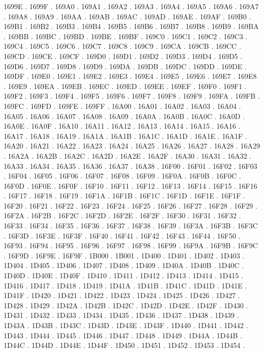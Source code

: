 1699E .
1699F .
169A0 .
169A1 .
169A2 .
169A3 .
169A4 .
169A5 .
169A6 .
169A7 .
169A8 .
169A9 .
169AA .
169AB .
169AC .
169AD .
169AE .
169AF .
169B0 .
169B1 .
169B2 .
169B3 .
169B4 .
169B5 .
169B6 .
169B7 .
169B8 .
169B9 .
169BA .
169BB .
169BC .
169BD .
169BE .
169BF .
169C0 .
169C1 .
169C2 .
169C3 .
169C4 .
169C5 .
169C6 .
169C7 .
169C8 .
169C9 .
169CA .
169CB .
169CC .
169CD .
169CE .
169CF .
169D0 .
169D1 .
169D2 .
169D3 .
169D4 .
169D5 .
169D6 .
169D7 .
169D8 .
169D9 .
169DA .
169DB .
169DC .
169DD .
169DE .
169DF .
169E0 .
169E1 .
169E2 .
169E3 .
169E4 .
169E5 .
169E6 .
169E7 .
169E8 .
169E9 .
169EA .
169EB .
169EC .
169ED .
169EE .
169EF .
169F0 .
169F1 .
169F2 .
169F3 .
169F4 .
169F5 .
169F6 .
169F7 .
169F8 .
169F9 .
169FA .
169FB .
169FC .
169FD .
169FE .
169FF .
16A00 .
16A01 .
16A02 .
16A03 .
16A04 .
16A05 .
16A06 .
16A07 .
16A08 .
16A09 .
16A0A .
16A0B .
16A0C .
16A0D .
16A0E .
16A0F .
16A10 .
16A11 .
16A12 .
16A13 .
16A14 .
16A15 .
16A16 .
16A17 .
16A18 .
16A19 .
16A1A .
16A1B .
16A1C .
16A1D .
16A1E .
16A1F .
16A20 .
16A21 .
16A22 .
16A23 .
16A24 .
16A25 .
16A26 .
16A27 .
16A28 .
16A29 .
16A2A .
16A2B .
16A2C .
16A2D .
16A2E .
16A2F .
16A30 .
16A31 .
16A32 .
16A33 .
16A34 .
16A35 .
16A36 .
16A37 .
16A38 .
16F00 .
16F01 .
16F02 .
16F03 .
16F04 .
16F05 .
16F06 .
16F07 .
16F08 .
16F09 .
16F0A .
16F0B .
16F0C .
16F0D .
16F0E .
16F0F .
16F10 .
16F11 .
16F12 .
16F13 .
16F14 .
16F15 .
16F16 .
16F17 .
16F18 .
16F19 .
16F1A .
16F1B .
16F1C .
16F1D .
16F1E .
16F1F .
16F20 .
16F21 .
16F22 .
16F23 .
16F24 .
16F25 .
16F26 .
16F27 .
16F28 .
16F29 .
16F2A .
16F2B .
16F2C .
16F2D .
16F2E .
16F2F .
16F30 .
16F31 .
16F32 .
16F33 .
16F34 .
16F35 .
16F36 .
16F37 .
16F38 .
16F39 .
16F3A .
16F3B .
16F3C .
16F3D .
16F3E .
16F3F .
16F40 .
16F41 .
16F42 .
16F43 .
16F44 .
16F50 .
16F93 .
16F94 .
16F95 .
16F96 .
16F97 .
16F98 .
16F99 .
16F9A .
16F9B .
16F9C .
16F9D .
16F9E .
16F9F .
1B000 .
1B001 .
1D400 .
1D401 .
1D402 .
1D403 .
1D404 .
1D405 .
1D406 .
1D407 .
1D408 .
1D409 .
1D40A .
1D40B .
1D40C .
1D40D .
1D40E .
1D40F .
1D410 .
1D411 .
1D412 .
1D413 .
1D414 .
1D415 .
1D416 .
1D417 .
1D418 .
1D419 .
1D41A .
1D41B .
1D41C .
1D41D .
1D41E .
1D41F .
1D420 .
1D421 .
1D422 .
1D423 .
1D424 .
1D425 .
1D426 .
1D427 .
1D428 .
1D429 .
1D42A .
1D42B .
1D42C .
1D42D .
1D42E .
1D42F .
1D430 .
1D431 .
1D432 .
1D433 .
1D434 .
1D435 .
1D436 .
1D437 .
1D438 .
1D439 .
1D43A .
1D43B .
1D43C .
1D43D .
1D43E .
1D43F .
1D440 .
1D441 .
1D442 .
1D443 .
1D444 .
1D445 .
1D446 .
1D447 .
1D448 .
1D449 .
1D44A .
1D44B .
1D44C .
1D44D .
1D44E .
1D44F .
1D450 .
1D451 .
1D452 .
1D453 .
1D454 .
